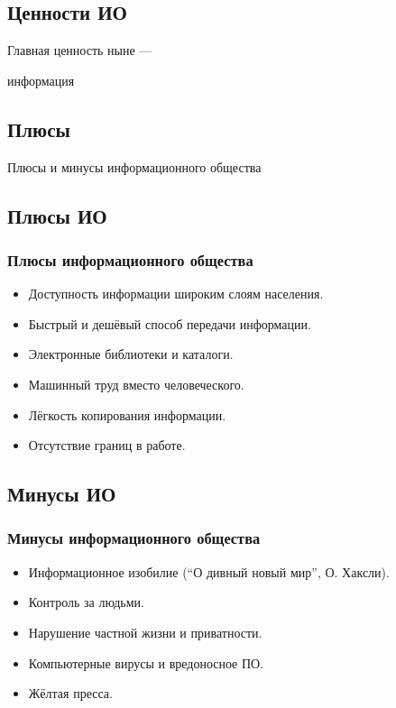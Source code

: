\documentclass[compress,red]{beamer}
\begin{document}
\subsection{Ценности ИО}
\begin{frame}
  \begin{center}
    \Large{Главная ценность ныне --- }
    
    \Huge{информация}
  \end{center}
\end{frame}

\subsection{Плюсы}
\begin{frame}
  \begin{center}
    \Huge{Плюсы и минусы информационного общества}
  \end{center}
\end{frame}

\subsection{Плюсы ИО}
\begin{frame}[fragile]
  \frametitle{Плюсы информационного общества}
  \begin{itemize}
    \item Доступность информации широким слоям населения.
    \item Быстрый и дешёвый способ передачи информации.
    \item Электронные библиотеки и каталоги.
    \item Машинный труд вместо человеческого.
    \item Лёгкость копирования информации.
    \item Отсутствие границ в работе.
  \end{itemize}
\end{frame}

\subsection{Минусы ИО}
\begin{frame}[fragile]
  \frametitle{Минусы информационного общества}
  \begin{itemize}
    \item Информационное изобилие (``О дивный новый мир'', О. Хаксли).
    \item Контроль за людьми.
    \item Нарушение частной жизни и приватности.
    \item Компьютерные вирусы и вредоносное ПО.
    \item Жёлтая пресса.
  \end{itemize}
\end{frame}
\end{document}
